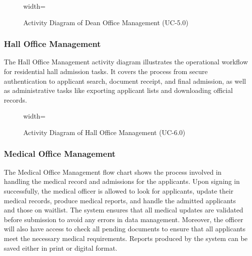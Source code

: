 \begin{figure}[H]
    \centering
    \begin{adjustbox}{width=\textwidth}
        
    \end{adjustbox}
    \caption{Activity Diagram of Dean Office Management (UC-5.0)}
    \label{fig:dean_office_activity}
\end{figure}
\FloatBarrier

\subsubsection{Hall Office Management}

The Hall Office Management activity diagram illustrates the operational workflow for residential hall admission tasks. It covers the process from secure authentication to applicant search, document receipt, and final admission, as well as administrative tasks like exporting applicant lists and downloading official records.

\begin{figure}[H]
    \centering
    \begin{adjustbox}{width=\textwidth}
        
    \end{adjustbox}
    \caption{Activity Diagram of Hall Office Management (UC-6.0)}
    \label{fig:hall_office_activity}
\end{figure}
\FloatBarrier


\subsubsection{Medical Office Management}

The Medical Office Management flow chart shows the process involved in handling the medical record and admissions for the applicants. Upon signing in successfully, the medical officer is allowed to look for applicants, update their medical records, produce medical reports, and handle the admitted applicants and those on waitlist. The system ensures that all medical updates are validated before submission to avoid any errors in data management. Moreover, the officer will also have access to check all pending documents to ensure that all applicants meet the necessary medical requirements. Reports produced by the system can be saved either in print or digital format.

